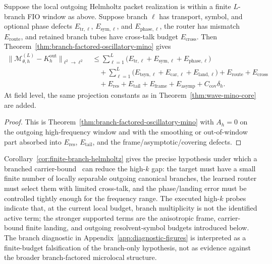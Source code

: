 \begin{corollary}
\label{cor:finite-branch-helmholtz}
\label{prop:finite-branch-helmholtz}
Suppose the local outgoing Helmholtz packet realization is within a finite $L$-branch FIO window as above.  Suppose branch $\ell$ has transport, symbol, and optional phase defects $E_{\mathrm{tr},\ell}$, $E_{\mathrm{sym},\ell}$, and $E_{\mathrm{phase},\ell}$, the router has mismatch $E_{\mathrm{route}}$, and retained branch tubes have cross-talk budget $E_{\mathrm{cross}}$.  Then Theorem~\ref{thm:branch-factored-oscillatory-mino} gives
\[
\begin{aligned}
\|\mathcal M_{\theta,h}^{(L)}-K_h^{\mathrm{out}}\|_{\ell^2\to\ell^2}
&\le
\sum_{\ell=1}^{L}
\bigl(E_{\mathrm{tr},\ell}+E_{\mathrm{sym},\ell}+E_{\mathrm{phase},\ell}\bigr)\\
&\quad+
\sum_{\ell=1}^{L}
\bigl(E_{\mathrm{tsyn},\ell}+E_{\mathrm{car},\ell}+E_{\mathrm{land},\ell}\bigr)
+E_{\mathrm{route}}+E_{\mathrm{cross}}\\
&\quad
+E_{\mathrm{res}}+E_{\mathrm{tail}}
+E_{\mathrm{frame}}+E_{\mathrm{asymp}}+C_{\mathrm{cov}}\delta_h .
\end{aligned}
\]
At field level, the same projection constants as in Theorem~\ref{thm:wave-mino-core} are added.
\end{corollary}

\begin{proof}
This is Theorem~\ref{thm:branch-factored-oscillatory-mino} with $A_h=0$ on the outgoing high-frequency window and with the smoothing or out-of-window part absorbed into $E_{\mathrm{res}}$, $E_{\mathrm{tail}}$, and the frame/asymptotic/covering defects.
\end{proof}

Corollary~\ref{cor:finite-branch-helmholtz} gives the precise hypothesis under which a branched carrier-bound \MiNO\ can reduce the high-$k$ gap: the target must have a small finite number of locally separable outgoing canonical branches, the learned router must select them with limited cross-talk, and the phase/landing error must be controlled tightly enough for the frequency range.  The executed high-$k$ probes indicate that, at the current local budget, branch multiplicity is not the identified active term; the stronger supported terms are the anisotropic frame, carrier-bound finite landing, and outgoing resolvent-symbol budgets introduced below.  The branch diagnostic in Appendix~\ref{app:diagnostic-figures} is interpreted as a finite-budget falsification of the branch-only hypothesis, not as evidence against the broader branch-factored microlocal structure.

